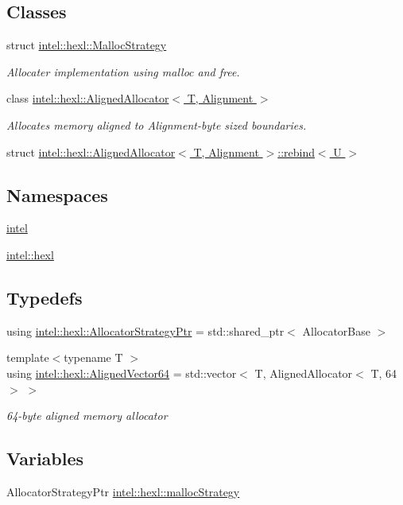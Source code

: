\subsection*{Classes}
\begin{DoxyCompactItemize}
\item 
struct \hyperlink{structintel_1_1hexl_1_1MallocStrategy}{intel\+::hexl\+::\+Malloc\+Strategy}
\begin{DoxyCompactList}\small\item\em Allocater implementation using malloc and free. \end{DoxyCompactList}\item 
class \hyperlink{classintel_1_1hexl_1_1AlignedAllocator}{intel\+::hexl\+::\+Aligned\+Allocator$<$ T, Alignment $>$}
\begin{DoxyCompactList}\small\item\em Allocates memory aligned to Alignment-\/byte sized boundaries. \end{DoxyCompactList}\item 
struct \hyperlink{structintel_1_1hexl_1_1AlignedAllocator_1_1rebind}{intel\+::hexl\+::\+Aligned\+Allocator$<$ T, Alignment $>$\+::rebind$<$ U $>$}
\end{DoxyCompactItemize}
\subsection*{Namespaces}
\begin{DoxyCompactItemize}
\item 
 \hyperlink{namespaceintel}{intel}
\item 
 \hyperlink{namespaceintel_1_1hexl}{intel\+::hexl}
\end{DoxyCompactItemize}
\subsection*{Typedefs}
\begin{DoxyCompactItemize}
\item 
using \hyperlink{namespaceintel_1_1hexl_aced64250965d3b78827d8009634eef0c}{intel\+::hexl\+::\+Allocator\+Strategy\+Ptr} = std\+::shared\+\_\+ptr$<$ Allocator\+Base $>$
\item 
{\footnotesize template$<$typename T $>$ }\\using \hyperlink{namespaceintel_1_1hexl_afbdf0d2cc4209ee547a88ff22a02801b}{intel\+::hexl\+::\+Aligned\+Vector64} = std\+::vector$<$ T, Aligned\+Allocator$<$ T, 64 $>$ $>$
\begin{DoxyCompactList}\small\item\em 64-\/byte aligned memory allocator \end{DoxyCompactList}\end{DoxyCompactItemize}
\subsection*{Variables}
\begin{DoxyCompactItemize}
\item 
Allocator\+Strategy\+Ptr \hyperlink{namespaceintel_1_1hexl_aedc86b34ea92ac34d036acff6d84479a}{intel\+::hexl\+::malloc\+Strategy}
\end{DoxyCompactItemize}
